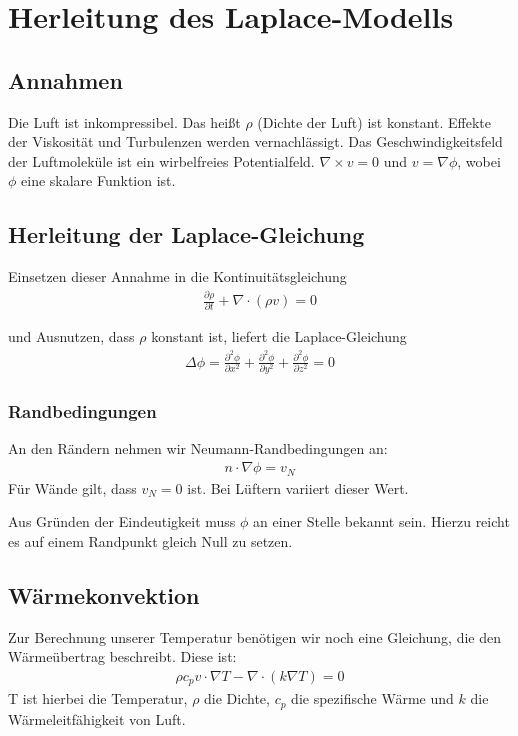 \documentclass[pdflatex,12pt,a4paper,twoside]{scrartcl}
\begin{document}
\section{Herleitung des Laplace-Modells}

\subsection{Annahmen}

Die Luft ist inkompressibel. Das heißt $\rho$ (Dichte der Luft) ist konstant.
Effekte der Viskosität und Turbulenzen werden vernachlässigt.
Das Geschwindigkeitsfeld der Luftmoleküle ist ein wirbelfreies Potentialfeld.
$\nabla \times v =0$ und $v= \nabla \phi$, wobei $\phi$ eine skalare Funktion ist.

\subsection{Herleitung der Laplace-Gleichung}

Einsetzen dieser Annahme in die Kontinuitätsgleichung
\begin{align*}
\frac{\partial \rho}{\partial t}+\nabla \cdot (\rho v)=0
\end{align*}

und Ausnutzen, dass $\rho$ konstant ist, liefert die Laplace-Gleichung
\begin{align*}
\Delta \phi = \frac{\partial^2 \phi}{\partial x^2}+\frac{\partial^2 \phi}{\partial y^2}+\frac{\partial^2 \phi}{\partial z^2}=0
\end{align*}

\subsubsection{Randbedingungen}
An den Rändern nehmen wir Neumann-Randbedingungen an:
\begin{align*}
n \cdot \nabla \phi =v_N
\end{align*}
Für Wände gilt, dass $v_N=0$ ist. Bei Lüftern variiert dieser Wert.

Aus Gründen der Eindeutigkeit muss $\phi$ an einer Stelle bekannt sein. Hierzu reicht es auf einem Randpunkt gleich Null zu setzen.

\subsection{Wärmekonvektion}

Zur Berechnung unserer Temperatur benötigen wir noch eine Gleichung, die den Wärmeübertrag beschreibt. Diese ist:
\begin{align*}
\rho c_p v \cdot \nabla T - \nabla \cdot (k\nabla T)=0
\end{align*}
T ist hierbei die Temperatur, $\rho$ die Dichte, $c_p$ die spezifische Wärme und $k$ die Wärmeleitfähigkeit von Luft. 
\end{document}
